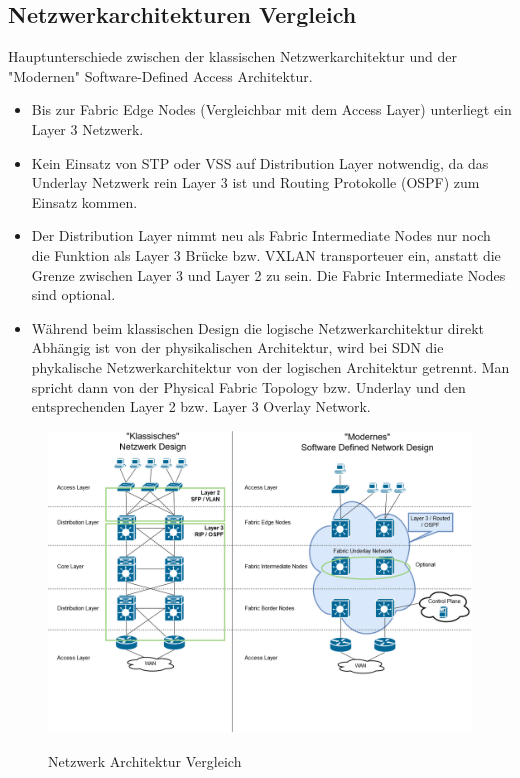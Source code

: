 \subsection{Netzwerkarchitekturen Vergleich}
Hauptunterschiede zwischen der klassischen Netzwerkarchitektur und der "Modernen" Software-Defined Access Architektur. 

\begin{itemize}
	\item Bis zur Fabric Edge Nodes (Vergleichbar mit dem Access Layer) unterliegt ein Layer 3 Netzwerk. 
	\item Kein Einsatz von STP oder VSS auf Distribution Layer notwendig, da das Underlay Netzwerk rein Layer 3 ist und Routing Protokolle (OSPF) zum Einsatz kommen.
	\item Der Distribution Layer nimmt neu als Fabric Intermediate Nodes nur noch die Funktion als Layer 3 Brücke bzw. VXLAN transporteuer ein, anstatt die Grenze zwischen Layer 3 und Layer 2 zu sein. Die Fabric Intermediate Nodes sind optional. 
	\item Während beim klassischen Design die logische Netzwerkarchitektur direkt Abhängig ist von der physikalischen Architektur, wird bei SDN die phykalische Netzwerkarchitektur von der logischen Architektur getrennt. Man spricht dann von der Physical Fabric Topology bzw. Underlay und den entsprechenden Layer 2 bzw. Layer 3 Overlay Network. 
\end{itemize}

\begin{figure}[H]
	\centering
	\includegraphics[width=1\linewidth]{img/LabNetworkArchitecture_Vergleich.png}\\[1px]
	\caption{Netzwerk Architektur Vergleich}
	\label{fig:LabNetworkArchitectureVergleich}
\end{figure}


